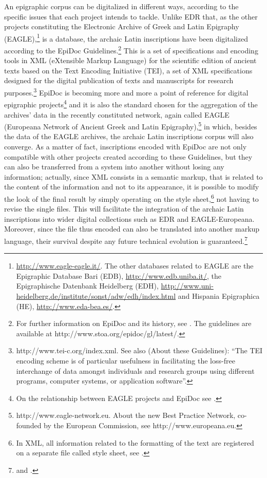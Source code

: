 \documentclass[amsthm,ebook]{saparticle}
\begin{document}
An epigraphic corpus can be digitalized in different ways, according to the specific issues that each project intends to
tackle. Unlike EDR that, as the other projects constituting the Electronic Archive of Greek and Latin Epigraphy
(EAGLE),\footnote{\url{http://www.eagle-eagle.it/}. The other databases related to EAGLE are the Epigraphic Database Bari
(EDB), \url{http://www.edb.uniba.it/}, the Epigraphische Datenbank Heidelberg (EDH),
\url{http://www.uni-heidelberg.de/institute/sonst/adw/edh/index.html} and Hispania Epigraphica (HE),
\url{http://www.eda-bea.es/}.} is a database, the archaic Latin inscriptions have been digitalized according to the EpiDoc
Guidelines.\footnote{For further information on EpiDoc and its history, see \citet{elliott_epidoc_2007}.
The guidelines are available at http://www.stoa.org/epidoc/gl/latest/.} This is a set of specifications and encoding
tools in XML (eXtensible Markup Language) for the scientific edition of ancient texts based on the Text Encoding
Initiative (TEI), a set of XML specifications designed for the digital publication of texts and manuscripts for
research purposes.\footnote{http://www.tei-c.org/index.xml. See also \citet{consortium_tei_2008} (About these Guidelines):
“The TEI encoding scheme is of particular usefulness in facilitating the loss-free interchange of data amongst
individuals and research groups using different programs, computer systems, or application software”.} EpiDoc is
becoming more and more a point of reference for digital epigraphic projects\footnote{On the relationship between EAGLE
projects and EpiDoc see \citet{felle_esperienze_2012}.} and it is also the standard chosen for the aggregation of the archives' data in
the recently constituted network, again called EAGLE (Europeana Network of Ancient Greek and Latin
Epigraphy),\footnote{http://www.eagle-network.eu. About the new Best Practice Network, co-founded by the European
Commission, see http://www.europeana.eu.} in which, besides the data of the EAGLE archives, the archaic Latin
inscriptions corpus will also converge. As a matter of fact, inscriptions encoded with EpiDoc are not only compatible
with other projects created according to these Guidelines, but they can also be transferred from a system into another
without losing any information; actually, since XML consists in a semantic markup, that is related to the content of
the information and not to its appearance, it is possible to modify the look of the final result by simply operating on
the style sheet,\footnote{In XML, all information related to the formatting of the text are registered on a separate
file called style sheet, see \citet[104, 110-111]{bodard_epidoc:_2009}.} not having to revise the single files. This will facilitate
the integration of the archaic Latin inscriptions into wider digital collections such as EDR and EAGLE-Europeana.
Moreover, since the file thus encoded can also be translated into another markup language, their survival despite any
future technical evolution is guaranteed.\footnote{\citet[37-38]{tissoni_epidoc_2008} and \citet[104-105]{bodard_epidoc:_2009}.}
\end{document}
